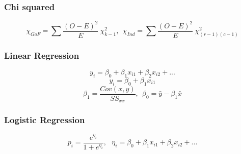 \documentclass[a4paper,12pt]{article}
\theoremstyle{Qstyle}
\begin{document}
	\subsubsection*{Chi squared}
	\[\chi_{GoF}=\sum \frac{(O-E)^2}{E} ~\chi^2_{k-1},\ \  \chi_{Ind}=\sum \frac{(O-E)^2}{E} ~\chi^2_{(r-1)(c-1)} \]
	
	\subsubsection*{Linear Regression}
	\[  y_i=\beta_0+\beta_1 x_{i1} +\beta_2 x_{i2}+... \]
	\[  y_i=\beta_0+\beta_1 x_{i1}\]
	\[  \beta_1 =\frac{Cov(x,y)}{SS_{xx}}, \ \  \beta_0 =\bar{y}-\beta_1\bar{x}\]
	
	\subsubsection*{Logistic Regression}
	\[  p_i=\frac{e^{\eta_i}}{1+e^{\eta_i}}, \ \ \ \eta_i=\beta_0+\beta_1 x_{i1} +\beta_2 x_{i2}+... \]
	
	
\end{document}
